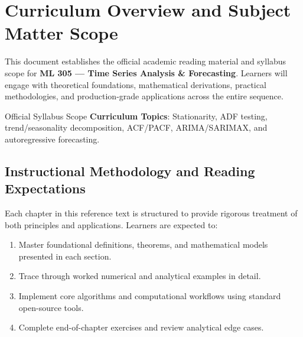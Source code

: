 \section{Curriculum Overview and Subject Matter Scope}

This document establishes the official academic reading material and syllabus scope for \textbf{ML 305 --- Time Series Analysis \& Forecasting}. Learners will engage with theoretical foundations, mathematical derivations, practical methodologies, and production-grade applications across the entire sequence.

\begin{InsightBox}{Official Syllabus Scope}
  \textbf{Curriculum Topics}: Stationarity, ADF testing, trend/seasonality decomposition, ACF/PACF, ARIMA/SARIMAX, and autoregressive forecasting.
\end{InsightBox}

\subsection{Instructional Methodology and Reading Expectations}

Each chapter in this reference text is structured to provide rigorous treatment of both principles and applications. Learners are expected to:
\begin{enumerate}
  \item Master foundational definitions, theorems, and mathematical models presented in each section.
  \item Trace through worked numerical and analytical examples in detail.
  \item Implement core algorithms and computational workflows using standard open-source tools.
  \item Complete end-of-chapter exercises and review analytical edge cases.
\end{enumerate}

